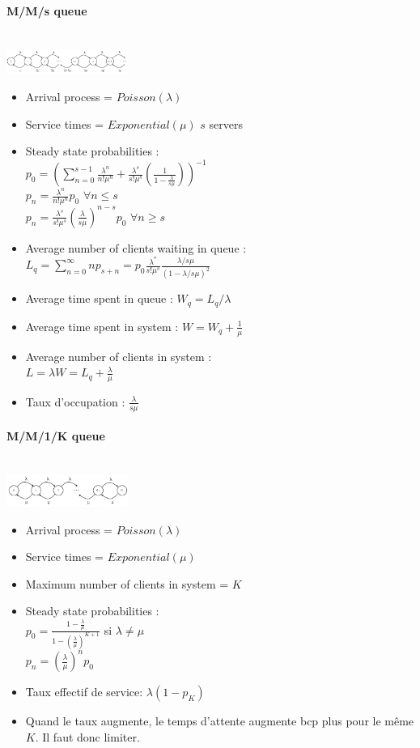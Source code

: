 \documentclass[paper=a4,fontsize=8pt,pagesize,DIV=calc]{scrartcl}
\begin{document}
\begin{multicols}{3}
\paragraph{M/M/s queue}~~\\
\includegraphics[width=0.3\textwidth]{MMs}
\begin{itemize}
\item Arrival process = $Poisson(\lambda)$
\item Service times = $Exponential(\mu)$ $s$ servers
\item Steady state probabilities : 
\\$p_0=\left(\sum_{n=0}^{s-1} \frac{\lambda^n}{n!\mu^n}+\frac{\lambda^s}{s!\mu^s}\left(\frac{1}{1-\frac{\lambda}{s \mu}}\right) \right)^{-1}$
\\$p_n=\frac{\lambda^n}{n!\mu^n}p_0$ \quad $\forall n\leq s$
\\$p_n=\frac{\lambda^s}{s!\mu^s}\left(\frac{\lambda}{s\mu}\right)^{n-s}p_0$ \quad $\forall n\geq s$
\item Average number of clients waiting in queue :
\\ $L_q=\sum_{n=0}^{\infty}np_{s+n}=p_0\frac{\lambda^*}{s!\mu^s}\frac{\lambda/s\mu}{(1-\lambda/s\mu)^2}$
\item Average time spent in queue : $W_q=L_q/\lambda$
\item Average time spent in system : $W=W_q+\frac{1}{\mu}$
\item Average number of clients in system : 
\\$L=\lambda W=L_q+\frac{\lambda}{\mu}$
\item Taux d'occupation : $\frac{\lambda}{s\mu}$
\end{itemize}
\paragraph{M/M/1/K queue}~~\\
\includegraphics[width=0.3\textwidth]{MMk}
\begin{itemize}
\item Arrival process = $Poisson(\lambda)$
\item Service times = $Exponential(\mu)$ 
\item Maximum number of clients in system = $K$
\item Steady state probabilities : 
\\$p_0=\frac{1-\frac{\lambda}{\mu}}{1-\left(\frac{\lambda}{\mu}\right)^{K+1}}$ \quad si $\lambda\neq \mu$
\\$p_n=\left(\frac{\lambda}{\mu}\right)^np_0$
\item Taux effectif de service: $\lambda(1-p_K)$
\item Quand le taux augmente, le temps d'attente augmente bcp plus pour le même $K$. Il faut donc limiter.
\end{itemize}

\end{multicols}
\end{document}

